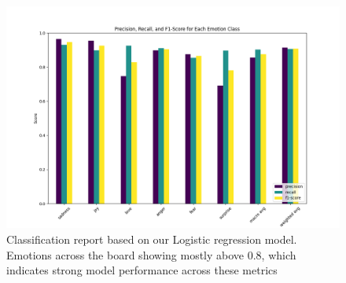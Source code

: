 \begin{figure}[H]
    \centering
    \includegraphics[width=1\columnwidth]{images/Classification_report_model1.png}
    \caption{Classification report based on our Logistic regression model. Emotions across the board showing mostly above 0.8, which indicates strong model performance across these metrics}
    \label{fig:correlation_plot}    
\end{figure}

